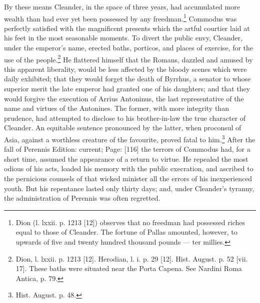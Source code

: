 By these means Cleander, in the space of three years, had accumulated more wealth than had ever yet been possessed by any freedman.\footnote{Dion (l. lxxii. p. 1213 [12]) observes that no freedman had possessed riches equal to those of Cleander. The fortune of Pallas amounted, however, to upwards of five and twenty hundred thousand pounds \texthebrew{—} ter millies.} Commodus was perfectly satisfied with the magnificent presents which the artful courtier laid at his feet in the most seasonable moments. To divert the public envy, Cleander, under the emperor\texthebrew{}’s name, erected baths, porticos, and places of exercise, for the use of the people.\footnote{Dion, l. lxxii. p. 1213 [12]. Herodian, l. i. p. 29 [12]. Hist. August. p. 52 [vii. 17]. These baths were situated near the Porta Capena. See Nardini Roma Antica, p. 79.} He flattered himself that the Romans, dazzled and amused by this apparent liberality, would be less affected by the bloody scenes which were daily exhibited; that they would forget the death of Byrrhus, a senator to whose superior merit the late emperor had granted one of his daughters; and that they would forgive the execution of Arrius Antoninus, the last representative of the name and virtues of the Antonines. The former, with more integrity than prudence, had attempted to disclose to his brother-in-law the true character of Cleander. An equitable sentence pronounced by the latter, when proconsul of Asia, against a worthless creature of the favourite, proved fatal to him.\footnote{Hist. August. p. 48.} After the fall of Perennis Edition: current; Page: [116] the terrors of Commodus had, for a short time, assumed the appearance of a return to virtue. He repealed the most odious of his acts, loaded his memory with the public execration, and ascribed to the pernicious counsels of that wicked minister all the errors of his inexperienced youth. But his repentance lasted only thirty days; and, under Cleander\texthebrew{}’s tyranny, the administration of Perennis was often regretted.


